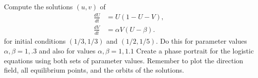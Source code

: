 \begin{problem}
	Compute the solutions $(u,v)$ of 
	\begin{align*}
		\frac{dU}{d\bar{t}} &= U(1-U-V),\\
		\frac{dV}{d\bar{t}} &= \alpha V (U-\beta).
	\end{align*}
	for initial conditions $(1/3, 1/3)$ and $(1/2, 1/5)$. Do this for parameter 
	values $\alpha, \beta = 1, .3$ and also for values $\alpha, \beta = 1, 1.1$
	Create a phase portrait for the logistic equations using both sets of parameter
	values. Remember to plot the direction field, all equilibrium points, and the orbits
	of the solutions.
\end{problem}
















